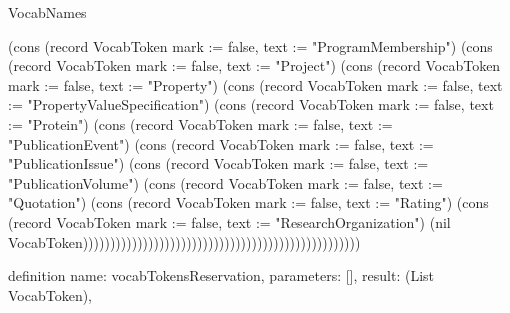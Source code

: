 \begin{lexlean}{VocabNames}
\begin{semanticmodule}
{(cons (record VocabToken {mark := false, text := "ProgramMembership"}) (cons (record VocabToken {mark := false, text := "Project"}) (cons (record VocabToken {mark := false, text := "Property"}) (cons (record VocabToken {mark := false, text := "PropertyValueSpecification"}) (cons (record VocabToken {mark := false, text := "Protein"}) (cons (record VocabToken {mark := false, text := "PublicationEvent"}) (cons (record VocabToken {mark := false, text := "PublicationIssue"}) (cons (record VocabToken {mark := false, text := "PublicationVolume"}) (cons (record VocabToken {mark := false, text := "Quotation"}) (cons (record VocabToken {mark := false, text := "Rating"}) (cons (record VocabToken {mark := false, text := "ResearchOrganization"}) (nil VocabToken)))))))))))))))))))))))))))))))))))))))))))))))))))
}

definition{
  name: vocabTokensReservation,
  parameters: [],
  result: (List VocabToken),
}
\end{semanticmodule}
\end{lexlean}
